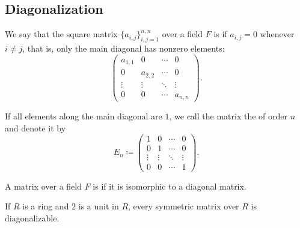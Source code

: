 \subsection{Diagonalization}\label{subsec:diagonalization}

\begin{definition}\label{def:diagonal_matrix}
  We say that the square matrix \( \{ a_{i,j} \}_{i,j=1}^{n,n} \) over a field \( F \) is  if \( a_{i,j} = 0 \) whenever \( i \neq j \), that is, only the main diagonal has nonzero elements:
  \begin{equation*}
    \begin{pmatrix}
      a_{1,1} & 0       & \cdots & 0 \\
      0       & a_{2,2} & \cdots & 0 \\
      \vdots  & \vdots  & \ddots & \vdots \\
      0       & 0       & \cdots & a_{n,n}
    \end{pmatrix}.
  \end{equation*}

  If all elements along the main diagonal are \( 1 \), we call the matrix the  of order \( n \) and denote it by
  \begin{equation*}
    E_n \coloneqq
    \begin{pmatrix}
      1       & 0       & \cdots & 0 \\
      0       & 1       & \cdots & 0 \\
      \vdots  & \vdots  & \ddots & \vdots \\
      0       & 0       & \cdots & 1
    \end{pmatrix}.
  \end{equation*}
\end{definition}

\begin{definition}\label{def:diagonalizable_matrix}
  A matrix over a field \( F \) is  if it is isomorphic to a diagonal matrix.
\end{definition}

\begin{theorem}\label{def:spectral_theorem_for_matrices}\cite[theorem 6.5]{Knapp2016BAlg}
  If \( R \) is a ring and \( 2 \) is a unit in \( R \), every symmetric matrix over \( R \) is diagonalizable.
\end{theorem}
